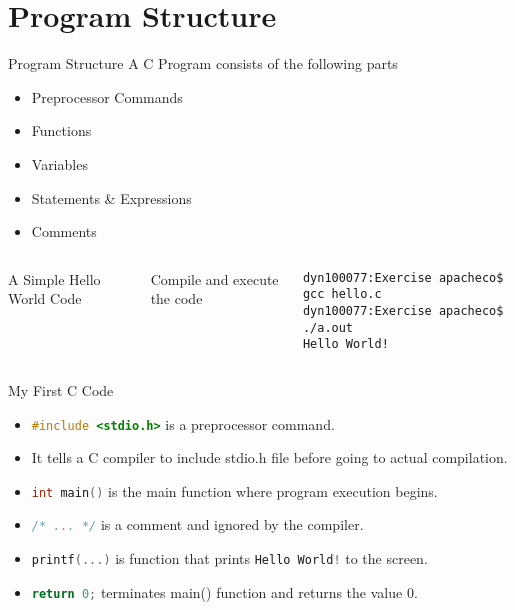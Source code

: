 \documentclass[10pt,t]{beamer}
\begin{document}
\section{Program Structure}
\begin{frame}[fragile]{Program Structure}
A C Program consists of the following parts
  \begin{itemize}
    \item Preprocessor Commands
    \item Functions
    \item Variables
    \item Statements \& Expressions
    \item Comments
  \end{itemize}
  \begin{columns}
    A Simple Hello World Code
    
    Compile and execute the code
    \begin{lstlisting}[style=LINUX]
dyn100077:Exercise apacheco$ gcc hello.c 
dyn100077:Exercise apacheco$ ./a.out 
Hello World!
    \end{lstlisting}
  \end{columns}
\end{frame}

\begin{frame}[fragile]{My First C Code}
  
  \begin{itemize}
    \item \lstinline[language=C]|#include <stdio.h>| is a preprocessor command.
    \item[] It tells a C compiler to include stdio.h file before going to actual compilation.
    \item \lstinline[language=C]|int main()| is the main function where program execution begins.
    \item \lstinline[language=C]|/* ... */| is a comment and ignored by the compiler.
    \item \lstinline[language=C]|printf(...)| is function that prints \lstinline[language=C]|Hello World!| to the screen.
    \item \lstinline[language=C]|return 0;| terminates main() function and returns the value 0.
  \end{itemize}
\end{frame}
\end{document}
